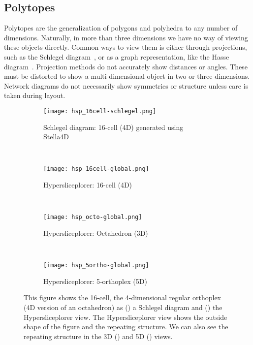 \subsection{Polytopes}
\label{sec:polytopes}

Polytopes are the
generalization of polygons and polyhedra to any number of dimensions.
Naturally, in more than three dimensions we have no way of viewing these
objects directly. Common ways to view them is either through
projections, such as the Schlegel diagram~\cite{Sommerville:1929}, or as a
graph representation, like the Hasse diagram~\cite{Battista:1988}. Projection
methods do not accurately show distances or angles. These must be distorted to
show a multi-dimensional object in two or three dimensions. Network diagrams do
not necessarily show symmetries or structure unless care is taken during
layout.

\begin{figure} 
  \centering
  \begin{subfigure}[b]{0.45\linewidth}
    \texttt{[image: hsp\_16cell-schlegel.png]}
    \caption{Schlegel diagram: 16-cell (4D) generated using Stella4D~\cite{Stella4D}}
    \label{fig:ortho:schlegel} 
  \end{subfigure} 
  ~
  \begin{subfigure}[b]{0.45\linewidth}
    \texttt{[image: hsp\_16cell-global.png]}
    \caption{Hypersliceplorer: 16-cell (4D)}
    \label{fig:ortho:4} 
  \end{subfigure}
  \\
  \begin{subfigure}[b]{0.45\linewidth}
    \texttt{[image: hsp\_octo-global.png]}
    \caption{Hypersliceplorer: Octahedron (3D)}
    \label{fig:ortho:3} 
  \end{subfigure}
  ~
  \begin{subfigure}[b]{0.45\linewidth}
    \texttt{[image: hsp\_5ortho-global.png]}
    \caption{Hypersliceplorer: 5-orthoplex (5D)}
    \label{fig:ortho:5} 
  \end{subfigure} 
  \caption[Views of regular polytopes]{%
    This figure shows the 16-cell, the 4-dimensional regular orthoplex (4D 
    version of
    an octahedron) as () a Schlegel diagram and
    () the Hypersliceplorer view. The Hypersliceplorer
    view shows the outside shape of the figure and the repeating structure.
    We can also see the repeating structure in the 3D ()
    and 5D () views.
  } 
  \label{fig:orthos} 
\end{figure}

